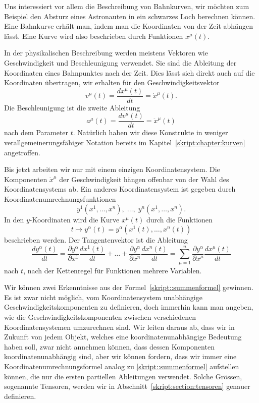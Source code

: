 Uns interessiert vor allem die Beschreibung von Bahnkurven, wir möchten
zum Beispiel den Absturz eines Astronauten in ein schwarzes Loch berechnen
%
%
können.
Eine Bahnkurve erhält man, indem man die Koordinaten von der Zeit
abhängen lässt.
Eine Kurve wird also beschrieben durch Funktionen $x^\mu(t)$.

In der physikalischen Beschreibung werden meistens Vektoren wie
Geschwindigkeit und Beschleunigung verwendet.
Sie sind die Ableitung der Koordinaten eines Bahnpunktes nach
der Zeit.
Dies lässt sich direkt auch auf die Koordinaten übertragen,
wir erhalten für den Geschwindigkeitsvektor
\[
v^{\mu}(t) = \frac{dx^\mu(t)}{dt} = \dot x^\mu(t).
\]
Die Beschleunigung ist die zweite Ableitung
\[
a^\mu(t)
=
\frac{dv^\mu(t)}{dt}
=
\ddot x^\mu(t)
\]
nach dem Parameter $t$.
Natürlich haben wir diese Konstrukte in weniger verallgemeinerungsfähiger
Notation bereits im Kapitel~\ref{skript:chapter:kurven} angetroffen.

Bis jetzt arbeiten wir nur mit einem einzigen Koordinatensystem.
Die Komponenten $\dot x^\mu$ der Geschwindigkeit hängen offenbar
von der Wahl des Koordinatensystems ab.
Ein anderes Koordinatensystem ist gegeben durch
Koordinatenumrechnungsfunktionen
\[
y^1(x^1,\dots,x^n),\;\dots,\;y^n(x^1,\dots,x^n).
\]
In den $y$-Koordinaten wird die Kurve $x^\mu(t)$ durch die Funktionen
\[
t\mapsto y^\alpha(t)=y^\alpha(x^1(t),\dots,x^n(t))
\]
beschrieben werden.
Der Tangentenvektor ist die Ableitung 
%
\begin{equation}
\frac{dy^\alpha(t)}{dt}
=
\frac{\partial y^\alpha}{\partial x^1}\frac{dx^1(t)}{dt}
+\dots+
\frac{\partial y^\alpha}{\partial x^n}\frac{dx^n(t)}{dt}
=
\sum_{\mu=1}^n
\frac{\partial y^\alpha}{\partial x^\mu}\frac{dx^\mu(t)}{dt}
\label{skript::summenformel}
\end{equation}
nach $t$, nach der Kettenregel für Funktionen mehrere Variablen.
%

Wir können zwei Erkenntnisse aus der Formel~\eqref{skript::summenformel}
gewinnen.
Es ist zwar nicht möglich, vom Koordinatensystem unabhängige
Geschwindigkeitskomponenten zu definieren, doch immerhin kann man
angeben, wie die Geschwindigkeitskomponenten zwischen verschiedenen
Koordinatensystemen umzurechnen sind.
Wir leiten daraus ab, dass wir in Zukunft von jedem Objekt, welches
eine koordinatenunabhängige Bedeutung haben soll, zwar nicht
annehmen können, dass dessen Komponenten koordinatenunabhängig sind,
aber wir können fordern, dass wir immer eine Koordinatenumrechnungsformel
analog zu \eqref{skript::summenformel} aufstellen können, die nur die
ersten partiellen Ableitungen verwendet.
Solche Grössen, sogenannte Tensoren, werden wir in
Abschnitt~\ref{skript:section:tensoren} genauer definieren.

